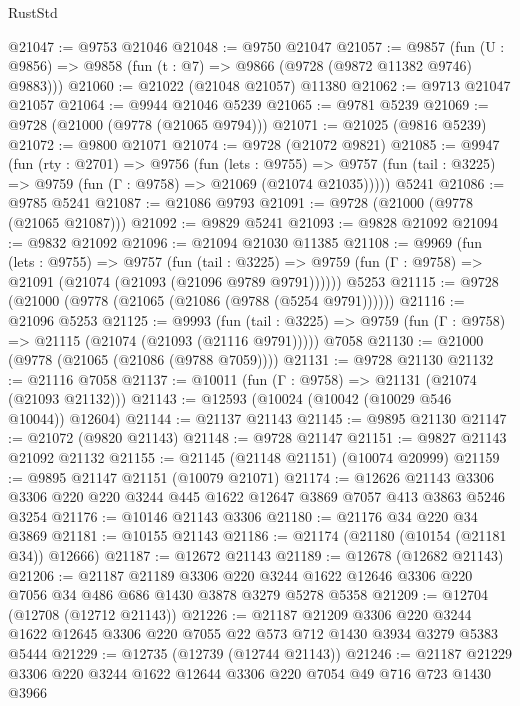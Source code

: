 \begin{lexlean}{RustStd}
\begin{coremodule}
@21047 := @9753 @21046
@21048 := @9750 @21047
@21057 := @9857
    (fun (U : @9856) => @9858 (fun (t : @7) => @9866 (@9728 (@9872 @11382 @9746) @9883)))
@21060 := @21022 (@21048 @21057) @11380
@21062 := @9713 @21047 @21057
@21064 := @9944 @21046 @5239
@21065 := @9781 @5239
@21069 := @9728 (@21000 (@9778 (@21065 @9794)))
@21071 := @21025 (@9816 @5239)
@21072 := @9800 @21071
@21074 := @9728 (@21072 @9821)
@21085 := @9947
    (fun (rty : @2701) =>
    @9756
      (fun (lets : @9755) =>
      @9757 (fun (tail : @3225) => @9759 (fun (Γ : @9758) => @21069 (@21074 @21035)))))
    @5241
@21086 := @9785 @5241
@21087 := @21086 @9793
@21091 := @9728 (@21000 (@9778 (@21065 @21087)))
@21092 := @9829 @5241
@21093 := @9828 @21092
@21094 := @9832 @21092
@21096 := @21094 @21030 @11385
@21108 := @9969
    (fun (lets : @9755) =>
    @9757
      (fun (tail : @3225) =>
      @9759 (fun (Γ : @9758) => @21091 (@21074 (@21093 (@21096 @9789 @9791))))))
    @5253
@21115 := @9728 (@21000 (@9778 (@21065 (@21086 (@9788 (@5254 @9791))))))
@21116 := @21096 @5253
@21125 := @9993
    (fun (tail : @3225) => @9759 (fun (Γ : @9758) => @21115 (@21074 (@21093 (@21116 @9791)))))
    @7058
@21130 := @21000 (@9778 (@21065 (@21086 (@9788 @7059))))
@21131 := @9728 @21130
@21132 := @21116 @7058
@21137 := @10011 (fun (Γ : @9758) => @21131 (@21074 (@21093 @21132)))
@21143 := @12593 (@10024 (@10042 (@10029 @546 @10044)) @12604)
@21144 := @21137 @21143
@21145 := @9895 @21130
@21147 := @21072 (@9820 @21143)
@21148 := @9728 @21147
@21151 := @9827 @21143 @21092 @21132
@21155 := @21145 (@21148 @21151) (@10074 @20999)
@21159 := @9895 @21147 @21151 (@10079 @21071)
@21174 := @12626
    @21143
    @3306
    @3306
    @220
    @220
    @3244
    @445
    @1622
    @12647
    @3869
    @7057
    @413
    @3863
    @5246
    @3254
@21176 := @10146 @21143 @3306
@21180 := @21176 @34 @220 @34 @3869
@21181 := @10155 @21143
@21186 := @21174 (@21180 (@10154 (@21181 @34)) @12666)
@21187 := @12672 @21143
@21189 := @12678 (@12682 @21143)
@21206 := @21187
    @21189
    @3306
    @220
    @3244
    @1622
    @12646
    @3306
    @220
    @7056
    @34
    @486
    @686
    @1430
    @3878
    @3279
    @5278
    @5358
@21209 := @12704 (@12708 (@12712 @21143))
@21226 := @21187
    @21209
    @3306
    @220
    @3244
    @1622
    @12645
    @3306
    @220
    @7055
    @22
    @573
    @712
    @1430
    @3934
    @3279
    @5383
    @5444
@21229 := @12735 (@12739 (@12744 @21143))
@21246 := @21187
    @21229
    @3306
    @220
    @3244
    @1622
    @12644
    @3306
    @220
    @7054
    @49
    @716
    @723
    @1430
    @3966

\end{coremodule}
\end{lexlean}

